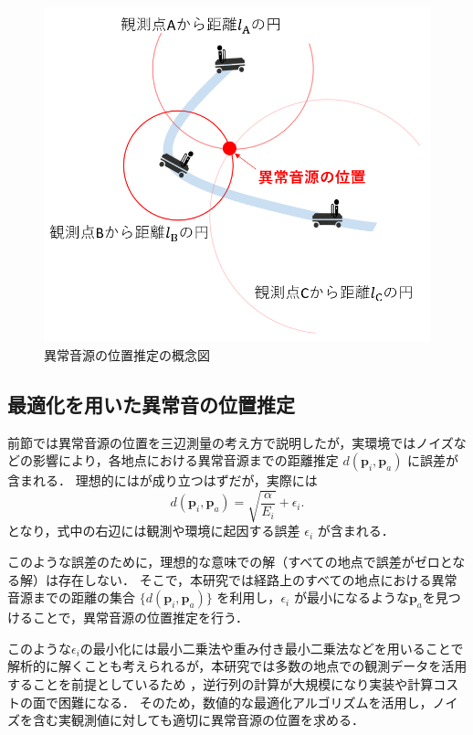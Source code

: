 \documentclass[../main]{subfiles}
\begin{document}
\begin{figure}[t]
    \centering
    \includegraphics[keepaspectratio, width=1.0\linewidth]{chap3/localization.png}
    \caption{異常音源の位置推定の概念図}
    \label{fig:localization}
  \end{figure}

\subsection{最適化を用いた異常音の位置推定}

前節では異常音源の位置を三辺測量の考え方で説明したが，実環境ではノイズなどの影響により，各地点における異常音源までの距離推定 $d(\mathbf{p}_i,\mathbf{p}_a)$ に誤差が含まれる．
理想的にはが成り立つはずだが，実際には
\begin{equation}
    d(\mathbf{p}_i, \mathbf{p}_a) = \sqrt{\frac{\alpha}{E_i}} + \epsilon_i.
\end{equation}
となり，式中の右辺には観測や環境に起因する誤差 $\epsilon_i$ が含まれる．

このような誤差のために，理想的な意味での解（すべての地点で誤差がゼロとなる解）は存在しない．
そこで，本研究では経路上のすべての地点における異常音源までの距離の集合 $\{d(\mathbf{p}_i, \mathbf{p}_a)\}$ を利用し，$\epsilon_i$ が最小になるような\( \mathbf{p}_a \)を見つけることで，異常音源の位置推定を行う．

このような$\epsilon_i$の最小化には最小二乗法や重み付き最小二乗法などを用いることで解析的に解くことも考えられるが，本研究では多数の地点での観測データを活用することを前提としているため
，逆行列の計算が大規模になり実装や計算コストの面で困難になる．
そのため，数値的な最適化アルゴリズムを活用し，ノイズを含む実観測値に対しても適切に異常音源の位置を求める．
\end{document}
